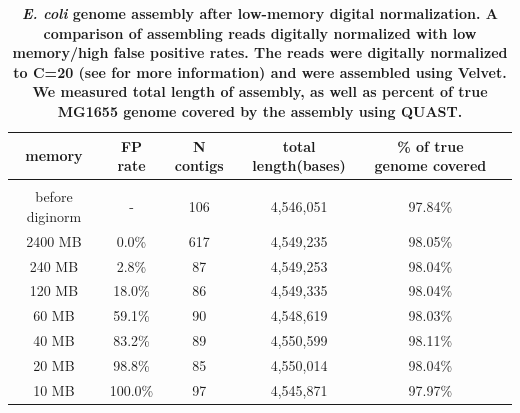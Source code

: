 \documentclass[10pt]{article}
\begin{document}
\begin{table}[!ht]
\caption{
\bf{{\em E. coli} genome assembly after low-memory digital normalization.
  A comparison of assembling reads digitally normalized with low memory/high
  false positive rates.  The reads were digitally normalized to 
  C=20 (see
  \cite{Brown2012} for more information) and were assembled using Velvet.
  We measured total length of assembly,
  as well as percent of true MG1655 genome covered by the assembly using QUAST.}}
\begin{tabular}{ | c | c | c | c | c | c |}
memory   & FP rate & N contigs & total length(bases) & \% of true genome covered \\
\hline \\
before diginorm  &-   & 106 & 4,546,051 & 97.84\% \\
    2400 MB  &  0.0\% & 617 & 4,549,235 & 98.05\% \\
     240 MB  &  2.8\% &  87 & 4,549,253 & 98.04\% \\
     120 MB  & 18.0\% &  86 & 4,549,335 & 98.04\% \\
      60 MB  & 59.1\% &  90 & 4,548,619 & 98.03\% \\
      40 MB  & 83.2\% &  89 & 4,550,599 & 98.11\% \\
      20 MB  & 98.8\% &  85 & 4,550,014 & 98.04\% \\
      10 MB  &100.0\% &  97 & 4,545,871 & 97.97\% \\
\end{tabular}
\begin{flushleft}
\end{flushleft}
\label{table:assembly}
\end{table}
\end{document}
